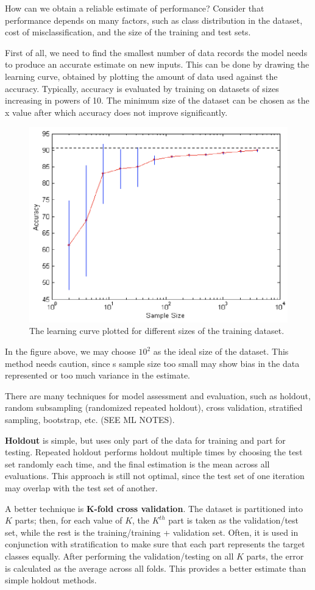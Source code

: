 How can we obtain a reliable estimate of performance? Consider that performance depends on many factors, such as class distribution in the dataset, cost of misclassification, and the size of the training and test sets.

First of all, we need to find the smallest number of data records the model needs to produce an accurate estimate on new inputs. This can be done by drawing the learning curve, obtained by plotting the amount of data used against the accuracy. Typically, accuracy is evaluated by training on datasets of sizes increasing in powers of 10. The minimum size of the dataset can be chosen as the x value after which accuracy does not improve significantly.

\begin{figure}[ht]
    \centering
    \includegraphics[width=0.5\linewidth]{img/Learning curve.png}
    \caption{The learning curve plotted for different sizes of the training dataset.}
\end{figure}
In the figure above, we may choose $10^2$ as the ideal size of the dataset. This method needs caution, since s sample size too small may show bias in the data represented or too much variance in the estimate.

There are many techniques for model assessment and evaluation, such as holdout, random subsampling (randomized repeated holdout), cross validation, stratified sampling, bootstrap, etc. (SEE ML NOTES).

\textbf{Holdout} is simple, but uses only part of the data for training and part for testing. Repeated holdout performs holdout multiple times by choosing the test set randomly each time, and the final estimation is the mean across all evaluations. This approach is still not optimal, since the test set of one iteration may overlap with the test set of another.

A better technique is \textbf{K-fold cross validation}. The dataset is partitioned into $K$ parts; then, for each value of $K$, the $K^{th}$ part is taken as the validation/test set, while the rest is the training/training + validation set. Often, it is used in conjunction with stratification to make sure that each part represents the target classes equally. After performing the validation/testing on all $K$ parts, the error is calculated as the average across all folds. This provides a better estimate than simple holdout methods.

